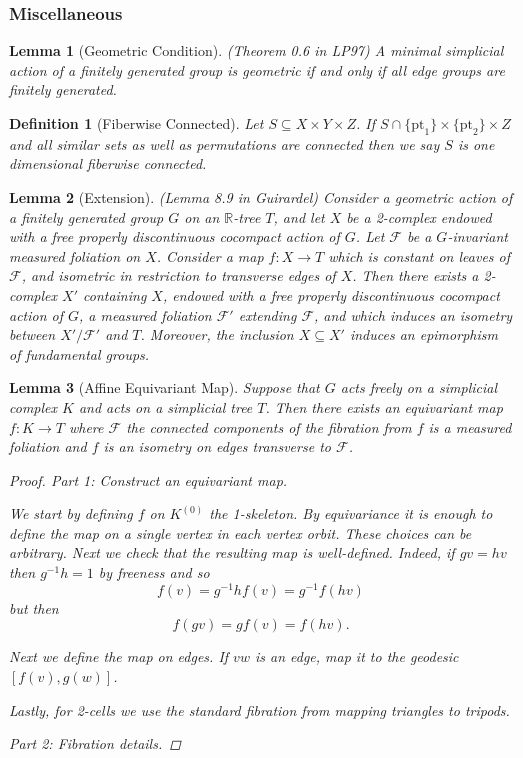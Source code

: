 \documentclass{article}
\theoremstyle{mystyle}
\newtheorem{lem}{Lemma}[section]
\newtheorem{defn}{Definition}
\theoremstyle{remark}
\begin{document}
\subsubsection{Miscellaneous}
\begin{lem}
    [Geometric Condition]
    \label{lem:simpgeo} 
    (Theorem 0.6 in LP97)
    A minimal simplicial action of a finitely generated group is geometric if and only if all edge groups are finitely generated.
\end{lem}
\begin{defn}
    [Fiberwise Connected]
    \label{def:connfibers} 
    Let \(S \subseteq X \times Y \times Z\). If \(S \cap \{\text{pt}_1\} \times \{\text{pt}_2\} \times Z\) and all similar sets as well as permutations are connected then we say \(S\) is one dimensional fiberwise connected.
\end{defn}
\begin{lem}
    [Extension]
    \label{lem:guirardel-extension}
    (Lemma 8.9 in Guirardel)
    Consider a geometric action of a finitely generated group \(G\) on an \(\mathbb{R}\)-tree \(T\), and let \(X\) be a 2-complex endowed with a free properly discontinuous cocompact action of \(G\). Let \(\mathscr{F}\) be a \(G\)-invariant measured foliation on \(X\). Consider a map \(f: X \to T\) which is constant on leaves of \(\mathscr{F}\), and isometric in restriction to transverse edges of \(X\). Then there exists a 2-complex \( X'\) containing \(X\), endowed with a free properly discontinuous cocompact action of \(G\), a measured foliation \(\mathscr{F} '\) extending \(\mathscr{F}\), and which induces an isometry between \(X'/ \mathscr{F}'\) and \(T\). Moreover, the inclusion \(X \subseteq X'\) induces an epimorphism of fundamental groups.
\end{lem}
\begin{lem}
    [Affine Equivariant Map]
    \label{lem:equivariant} 
    Suppose that \(G\) acts freely on a simplicial complex \(K\) and acts on a simplicial tree \(T\). Then there exists an equivariant map \(f: K \to T\) where \(\mathscr{F}\) the connected components of the fibration from \(f\) is a measured foliation and \(f\) is an isometry on edges transverse to \(\mathscr{F}\).
    \begin{proof}
        Part 1: Construct an equivariant map.

        We start by defining \(f\) on \(K^{(0)}\) the 1-skeleton. By equivariance it is enough to define the map on a single vertex in each vertex orbit. These choices can be arbitrary. Next we check that the resulting map is well-defined. Indeed, if \(gv=hv\) then \(g^{-1} h = 1\) by freeness and so \[ f(v)=g^{-1}h f(v)=g^{-1} f(hv) \] but then \[ f(gv)=gf(v)=f(hv).\] 
        
        Next we define the map on edges. If \(vw\) is an edge, map it to the geodesic \([f(v),g(w)]\). 
        
        Lastly, for 2-cells we use the standard fibration from mapping triangles to tripods.
        
        Part 2: Fibration details.
    \end{proof}
\end{lem}
\end{document}
